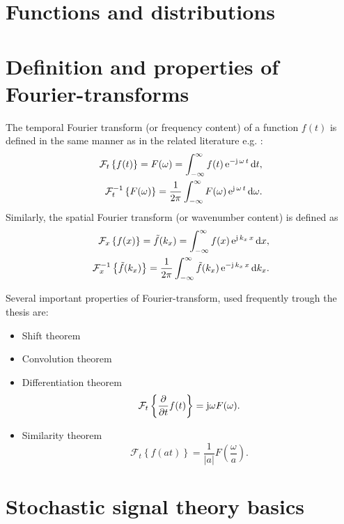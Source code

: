 \section{Functions and distributions}
\section{Definition and properties of Fourier-transforms}

The temporal Fourier transform (or frequency content) of a function $f(t)$ is defined in the same manner as in the related literature e.g. \cite{Ahrens2012, Ahrens2010a}:
%
\begin{align}
\mathcal{F}_{t} \left\{  f(t) \right\}  = F(\omega) = \int_{-\infty}^{\infty} f(t) \, \mathrm{e}^{-\mathrm{j} \,\omega \, t} \, \mathrm{d} t, \\
\mathcal{F}^{-1}_{t} \left\{  F(\omega) \right\}  = \frac{1}{2\pi} \int_{-\infty}^{\infty} F(\omega)\, \mathrm{e}^{\mathrm{j}\, \omega\, t} \, \mathrm{d} \omega.
\label{Eq:Math:Temp_Fourier}
\end{align}
%
Similarly, the spatial Fourier transform (or wavenumber content) is defined as
%
\begin{align}
\mathcal{F}_{x} \left\{  f(x) \right\}  = \tilde{f}(k_x) = \int_{-\infty}^{\infty} f(x)\, \mathrm{e}^{\mathrm{j}\, k_x\, x}\, \mathrm{d} x, \\
\mathcal{F}^{-1}_{x} \left\{  \tilde{f}(k_x) \right\}  = \frac{1}{2\pi} \int_{-\infty}^{\infty} \tilde{f}(k_x)\, \mathrm{e}^{-\mathrm{j}\, k_x\, x}\, \mathrm{d} k_x.
\end{align}

Several important properties of Fourier-transform, used frequently trough the thesis are:
\begin{itemize}
\item Shift theorem
%
\item Convolution theorem
%
\item Differentiation theorem
\begin{equation}
\mathcal{F}_{t} \left\{ \frac{\partial}{\partial t} f(t) \right\}  = \mathrm{j} \omega F(\omega).
\label{Eq:Math:Fourier_tr_diff}
\end{equation}
%
\item Similarity theorem
\begin{equation}
\mathcal{F}_{t} \left\{ f(a t) \right\}  = \frac{1}{|a|} F(\frac{\omega}{a}).
\label{Eq:Math:Fourier_tr_similarity}
\end{equation}
\end{itemize}
  

\section{Stochastic signal theory basics}
